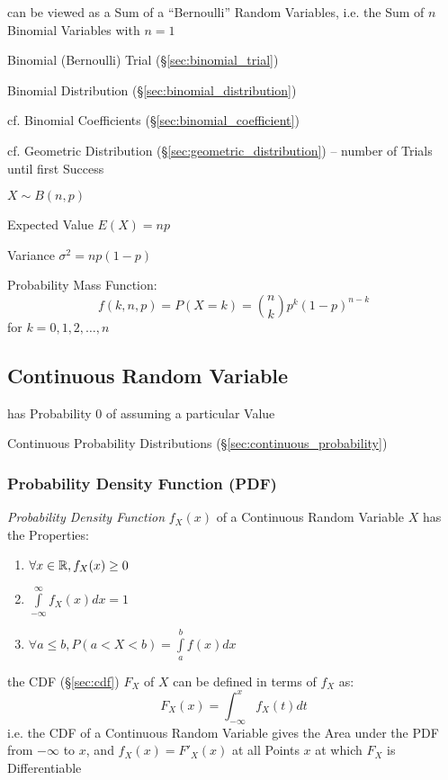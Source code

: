 can be viewed as a Sum of a ``Bernoulli'' Random Variables, i.e. the Sum of $n$
Binomial Variables with $n = 1$

Binomial (Bernoulli) Trial (\S\ref{sec:binomial_trial})

Binomial Distribution (\S\ref{sec:binomial_distribution})

cf. Binomial Coefficients (\S\ref{sec:binomial_coefficient})

\fist cf. Geometric Distribution (\S\ref{sec:geometric_distribution}) -- number
of Trials until first Success

$X \sim B(n,p)$

Expected Value $E(X) = np$

Variance $\sigma^2 = np(1-p)$

Probability Mass Function:
\[
  f(k,n,p) = P(X = k) = \binom{n}{k} p^k (1-p)^{n-k}
\]
for $k = 0,1,2, \ldots, n$



\subsection{Continuous Random Variable}\label{sec:continuous_random_variable}

has Probability $0$ of assuming a particular Value

\fist Continuous Probability Distributions (\S\ref{sec:continuous_probability})



\subsubsection{Probability Density Function (PDF)}\label{sec:pdf}

\emph{Probability Density Function} $f_X(x)$ of a Continuous Random Variable $X$
has the Properties:
\begin{enumerate}
  \item $\forall x \in \mathbb{R}, f_X(x) \geq 0$
  \item $\int\limits_{-\infty}^{\infty} f_X(x) dx = 1$
  \item $\forall a \leq b, P (a < X < b) = \int\limits_a^b f(x) dx$
\end{enumerate}
the CDF (\S\ref{sec:cdf}) $F_X$ of $X$ can be defined in terms of $f_X$ as:
\[
  F_X(x) = \int_{-\infty}^x f_X(t)dt
\]
i.e. the CDF of a Continuous Random Variable gives the Area under the PDF from
$-\infty$ to $x$, and $f_X(x) = F'_X(x)$ at all Points $x$ at which $F_X$ is
Differentiable

